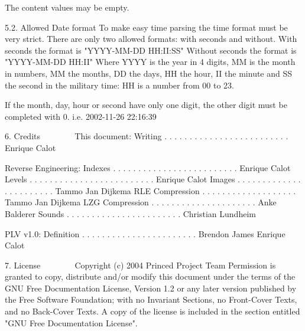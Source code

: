  The content values may be empty.

5.2. Allowed Date format
 To make easy time parsing the time format must be very strict.
 There are only two allowed formats: with seconds and without.
 With seconds the format is "YYYY-MM-DD HH:II:SS"
 Without seconds the format is "YYYY-MM-DD HH:II"
 Where YYYY is the year in 4 digits, MM is the month in numbers, MM the
 months, DD the days, HH the hour, II the minute and SS the second in the
 military time: HH is a number from 00 to 23.
 
 If the month, day, hour or second have only one digit, the other digit
 must be completed with 0.
 i.e. 2002-11-26 22:16:39

6. Credits
   ~~~~~~~
 This document:
  Writing . . . . . . . . . . . . . . . . . . . . . . . . . Enrique Calot

 Reverse Engineering:
  Indexes . . . . . . . . . . . . . . . . . . . . . . . . . Enrique Calot
  Levels . . . . . . . . . . . . . . . . . . . . . . . . .  Enrique Calot
  Images . . . . . . . . . . . . . . . . . . . . . . .  Tammo Jan Dijkema
  RLE Compression . . . . . . . . . . . . . . . . . . . Tammo Jan Dijkema
  LZG Compression . . . . . . . . . . . . . . . . . . . . . Anke Balderer
  Sounds . . . . . . . . . . . . . . . . . . . . . . . Christian Lundheim
 
 PLV v1.0:
  Definition . . . . . . . . . . . . . . . . . . . . . . .  Brendon James
	                                                          Enrique Calot

7. License
   ~~~~~~~
      Copyright (c)  2004  Princed Project Team
      Permission is granted to copy, distribute and/or modify this document
      under the terms of the GNU Free Documentation License, Version 1.2
      or any later version published by the Free Software Foundation;
      with no Invariant Sections, no Front-Cover Texts, and no Back-Cover
      Texts.  A copy of the license is included in the section entitled
      "GNU Free Documentation License".

